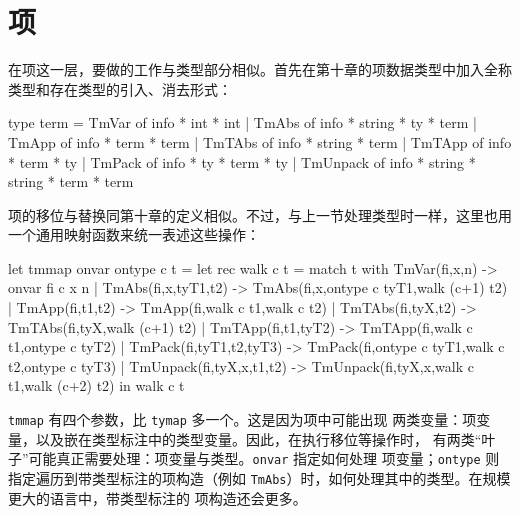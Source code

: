 \section{项}
\label{sec:25.3}

在项这一层，要做的工作与类型部分相似。首先在第十章的项数据类型中加入全称
类型和存在类型的引入、消去形式：
\begin{taplocamlcode}
type term =
    TmVar of info * int * int
  | TmAbs of info * string * ty * term
  | TmApp of info * term * term
  | TmTAbs of info * string * term
  | TmTApp of info * term * ty
  | TmPack of info * ty * term * ty
  | TmUnpack of info * string * string * term * term
\end{taplocamlcode}

项的移位与替换同第十章的定义相似。不过，与上一节处理类型时一样，这里也用
一个通用映射函数来统一表述这些操作：
\begin{taplocamlcode}
let tmmap onvar ontype c t =
  let rec walk c t = match t with
      TmVar(fi,x,n) -> onvar fi c x n
    | TmAbs(fi,x,tyT1,t2) ->
        TmAbs(fi,x,ontype c tyT1,walk (c+1) t2)
    | TmApp(fi,t1,t2) ->
        TmApp(fi,walk c t1,walk c t2)
    | TmTAbs(fi,tyX,t2) ->
        TmTAbs(fi,tyX,walk (c+1) t2)
    | TmTApp(fi,t1,tyT2) ->
        TmTApp(fi,walk c t1,ontype c tyT2)
    | TmPack(fi,tyT1,t2,tyT3) ->
        TmPack(fi,ontype c tyT1,walk c t2,ontype c tyT3)
    | TmUnpack(fi,tyX,x,t1,t2) ->
        TmUnpack(fi,tyX,x,walk c t1,walk (c+2) t2)
  in walk c t
\end{taplocamlcode}

\texttt{tmmap} 有四个参数，比 \texttt{tymap} 多一个。这是因为项中可能出现
两类变量：项变量，以及嵌在类型标注中的类型变量。因此，在执行移位等操作时，
有两类“叶子”可能真正需要处理：项变量与类型。\texttt{onvar} 指定如何处理
项变量；\texttt{ontype} 则指定遍历到带类型标注的项构造（例如
\texttt{TmAbs}）时，如何处理其中的类型。在规模更大的语言中，带类型标注的
项构造还会更多。

